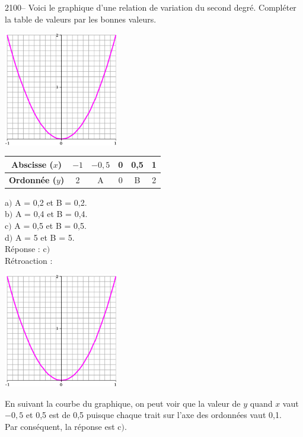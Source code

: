 \documentclass[letterpaper, 12pt]{article}
\begin{document}

2100-- Voici le graphique d'une relation de variation du second degr\'e. Compl\'eter la table de valeurs par les bonnes valeurs.
\begin{center}
 \includegraphics[width=5cm]{Q2100.eps}
\end{center}
\begin{center}
 \begin{tabular}{|c||c| c | c | c | c |} \hline
{\bf Abscisse ($x$)} & $-1$ & $-0,5$ & 0 & 0,5 & 1 \\ \hline \hline
{\bf Ordonn\'ee ($y$)} & 2 & A & 0 & B & 2 \\ \hline
\end{tabular}
\end{center}
a$)$ A = 0,2 et B = 0,2.\\
b$)$ A = 0,4 et B = 0,4.\\
c$)$ A = 0,5 et B = 0,5.\\
d$)$ A = 5 et B = 5.\\

R\'eponse : c$)$\\

R\'etroaction :\\
\begin{center}
 \includegraphics[width=5cm]{Q2100.eps}
\end{center}
En suivant la courbe du graphique, on peut voir que la valeur de $y$ quand $x$ vaut $-0,5$ et 0,5 est de 0,5 puisque chaque trait sur l'axe des ordonn\'ees vaut 0,1.\\
Par cons\'equent, la r\'eponse est c$)$.\\
\end{document}
